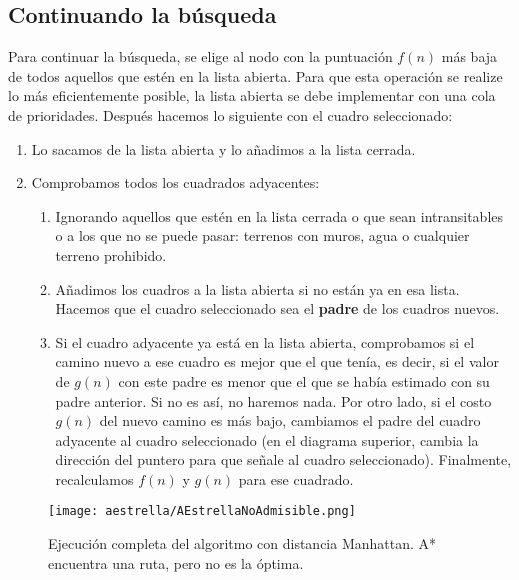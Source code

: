 \subsection{Continuando la b\'usqueda}

Para continuar la búsqueda, se elige al nodo con la puntuación \(f(n)\) más baja de todos aquellos que estén en la lista abierta. Para que esta operación se realize lo más eficientemente posible, la lista abierta se debe implementar con una cola de prioridades. Después hacemos lo siguiente con el cuadro seleccionado:

\begin{enumerate}
  \item Lo sacamos de la lista abierta y lo añadimos a la lista cerrada.  

  \item Comprobamos todos los cuadrados adyacentes:
  
  \begin{enumerate}
   \item Ignorando aquellos que estén en la lista cerrada o que sean intransitables o a los que no se puede pasar: terrenos con muros, agua o cualquier terreno prohibido.
   
   \item Añadimos los cuadros a la lista abierta si no están ya en esa lista. Hacemos que el cuadro seleccionado sea el \textbf{padre} de los cuadros nuevos.
   
   \item Si el cuadro adyacente ya está en la lista abierta, comprobamos si el camino nuevo a ese cuadro es mejor que el que tenía, es decir, si el valor de \(g(n)\) con este padre es menor que el que se había estimado con su padre anterior. Si no es así, no haremos nada. Por otro lado, si el costo \(g(n)\) del nuevo camino es más bajo, cambiamos el padre del cuadro adyacente al cuadro seleccionado (en el diagrama superior, cambia la dirección del puntero para que señale al cuadro seleccionado). Finalmente, recalculamos \(f(n)\) y \(g(n)\) para ese cuadrado.
  \end{enumerate}
\end{enumerate}


\begin{figure}[h!]
  \centering
  \texttt{[image: aestrella/AEstrellaNoAdmisible.png]}
  \caption{Ejecución completa del algoritmo con distancia Manhattan. A* encuentra una ruta, pero no es la óptima.}
  \label{fig:NoAdmisible}
\end{figure}

